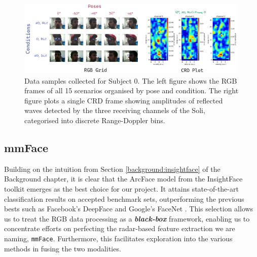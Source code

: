 \documentclass{mpaper}
\begin{document}
\begin{figure}[h!]
    \centering
    \includegraphics[width=0.99\textwidth]{figures/rgb_crd_plot.png}
    \vspace{0.2cm}
    \caption{Data samples collected for Subject 0. The left figure shows the RGB frames of all 15 scenarios organised by pose and condition. The right figure plots a single CRD frame showing amplitudes of reflected waves detected by the three receiving channels of the Soli, categorised into discrete Range-Doppler bins.}
    \label{fig:rgb_crd_plot}
\end{figure}


\subsection{mmFace}
Building on the intuition from Section \ref{background:insightface} of the Background chapter, it is clear that the ArcFace model from the InsightFace toolkit emerges as the best choice for our project. It attains state-of-the-art classification results on accepted benchmark sets, outperforming the previous bests such as Facebook's DeepFace \cite{taigman2014deepface} and Google's FaceNet \cite{schroff2015facenet}. This selection allows us to treat the RGB data processing as a \textbf{\textit{black-box}} framework, enabling us to concentrate efforts on perfecting the radar-based feature extraction we are naming, \texttt{mmFace}. Furthermore, this facilitates exploration into the various methods in fusing the two modalities. 
\end{document}
